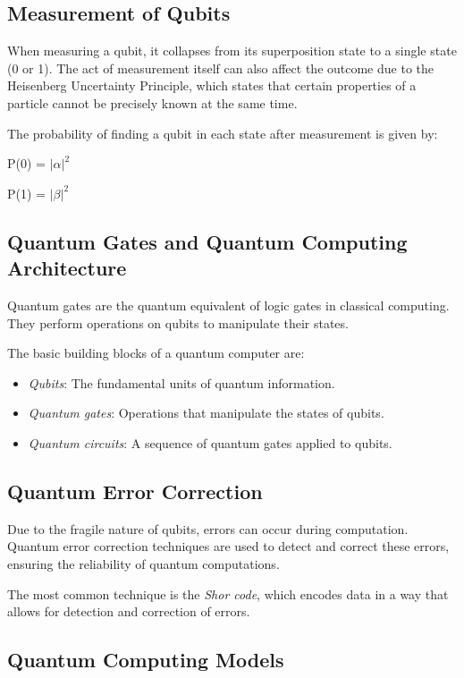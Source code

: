 \documentclass{report}%
\begin{document}
\subsection{Measurement of Qubits}

When measuring a qubit, it collapses from its superposition state to a single state (0 or 1). The act of measurement itself can also affect the outcome due to the Heisenberg Uncertainty Principle, which states that certain properties of a particle cannot be precisely known at the same time.

The probability of finding a qubit in each state after measurement is given by:

P(0) = $|\alpha|^2$

P(1) = $|\beta|^2$

\subsection{Quantum Gates and Quantum Computing Architecture}

Quantum gates are the quantum equivalent of logic gates in classical computing. They perform operations on qubits to manipulate their states.

The basic building blocks of a quantum computer are:

\begin{itemize}
\item \textit{Qubits}: The fundamental units of quantum information.
\item \textit{Quantum gates}: Operations that manipulate the states of qubits.
\item \textit{Quantum circuits}: A sequence of quantum gates applied to qubits.
\end{itemize}

\subsection{Quantum Error Correction}

Due to the fragile nature of qubits, errors can occur during computation. Quantum error correction techniques are used to detect and correct these errors, ensuring the reliability of quantum computations.

The most common technique is the \textit{Shor code}, which encodes data in a way that allows for detection and correction of errors.

\subsection{Quantum Computing Models}
\end{document}

